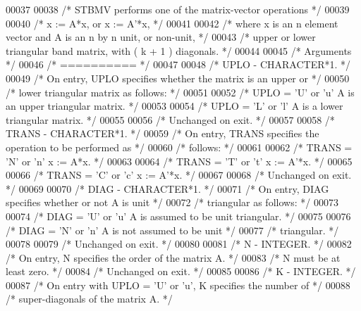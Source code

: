 \begin{DoxyCode}
00037 
00038 \textcolor{comment}{/*  STBMV  performs one of the matrix-vector operations */}
00039 
00040 \textcolor{comment}{/*     x := A*x,   or   x := A'*x, */}
00041 
00042 \textcolor{comment}{/*  where x is an n element vector and  A is an n by n unit, or non-unit, */}
00043 \textcolor{comment}{/*  upper or lower triangular band matrix, with ( k + 1 ) diagonals. */}
00044 
00045 \textcolor{comment}{/*  Arguments */}
00046 \textcolor{comment}{/*  ========== */}
00047 
00048 \textcolor{comment}{/*  UPLO   - CHARACTER*1. */}
00049 \textcolor{comment}{/*           On entry, UPLO specifies whether the matrix is an upper or */}
00050 \textcolor{comment}{/*           lower triangular matrix as follows: */}
00051 
00052 \textcolor{comment}{/*              UPLO = 'U' or 'u'   A is an upper triangular matrix. */}
00053 
00054 \textcolor{comment}{/*              UPLO = 'L' or 'l'   A is a lower triangular matrix. */}
00055 
00056 \textcolor{comment}{/*           Unchanged on exit. */}
00057 
00058 \textcolor{comment}{/*  TRANS  - CHARACTER*1. */}
00059 \textcolor{comment}{/*           On entry, TRANS specifies the operation to be performed as */}
00060 \textcolor{comment}{/*           follows: */}
00061 
00062 \textcolor{comment}{/*              TRANS = 'N' or 'n'   x := A*x. */}
00063 
00064 \textcolor{comment}{/*              TRANS = 'T' or 't'   x := A'*x. */}
00065 
00066 \textcolor{comment}{/*              TRANS = 'C' or 'c'   x := A'*x. */}
00067 
00068 \textcolor{comment}{/*           Unchanged on exit. */}
00069 
00070 \textcolor{comment}{/*  DIAG   - CHARACTER*1. */}
00071 \textcolor{comment}{/*           On entry, DIAG specifies whether or not A is unit */}
00072 \textcolor{comment}{/*           triangular as follows: */}
00073 
00074 \textcolor{comment}{/*              DIAG = 'U' or 'u'   A is assumed to be unit triangular. */}
00075 
00076 \textcolor{comment}{/*              DIAG = 'N' or 'n'   A is not assumed to be unit */}
00077 \textcolor{comment}{/*                                  triangular. */}
00078 
00079 \textcolor{comment}{/*           Unchanged on exit. */}
00080 
00081 \textcolor{comment}{/*  N      - INTEGER. */}
00082 \textcolor{comment}{/*           On entry, N specifies the order of the matrix A. */}
00083 \textcolor{comment}{/*           N must be at least zero. */}
00084 \textcolor{comment}{/*           Unchanged on exit. */}
00085 
00086 \textcolor{comment}{/*  K      - INTEGER. */}
00087 \textcolor{comment}{/*           On entry with UPLO = 'U' or 'u', K specifies the number of */}
00088 \textcolor{comment}{/*           super-diagonals of the matrix A. */}

\end{DoxyCode}
